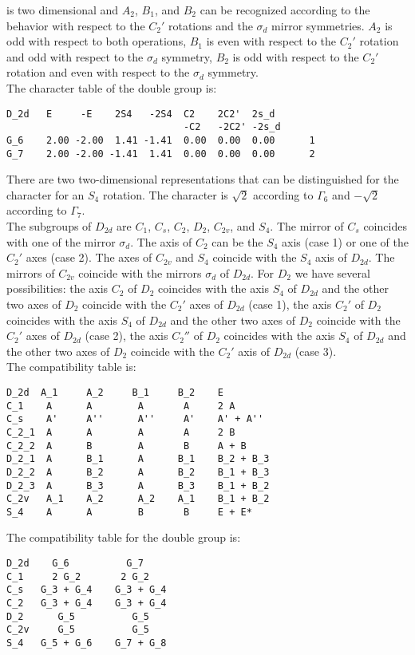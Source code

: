\documentclass[12pt,a4paper]{article}
\begin{document}
is two dimensional and $A_2$, $B_1$, and $B_2$ can be recognized according to
the behavior with respect to the $C_2'$ rotations and the $\sigma_d$
mirror symmetries. $A_2$ is odd with respect to both operations, $B_1$ is
even with respect to the $C_2'$ rotation and odd with respect to the
$\sigma_d$ symmetry, $B_2$ is odd with respect to the $C_2'$ rotation and 
even with respect to the $\sigma_d$ symmetry. \\
The character table of the double group is:
\begin{verbatim}
D_2d   E     -E    2S4   -2S4  C2    2C2'  2s_d 
                               -C2   -2C2' -2s_d
G_6    2.00 -2.00  1.41 -1.41  0.00  0.00  0.00      1
G_7    2.00 -2.00 -1.41  1.41  0.00  0.00  0.00      2
\end{verbatim}
There are two two-dimensional representations that can be distinguished
for the character for an $S_4$ rotation. The character is $\sqrt{2}$
according to $\Gamma_6$ and $-\sqrt{2}$ according to $\Gamma_7$. \\
The subgroups of $D_{2d}$ are $C_1$, $C_s$, $C_2$, $D_2$, $C_{2v}$, 
and $S_4$. The mirror of $C_s$ coincides with one of the mirror $\sigma_d$. 
The axis of $C_2$ can be the $S_4$ axis (case 1) or one of the 
$C_2'$ axes (case 2). The axes of $C_{2v}$ and $S_4$
coincide with the $S_4$ axis of $D_{2d}$. The mirrors of $C_{2v}$
coincide with the mirrors $\sigma_d$ of $D_{2d}$. For $D_2$ we have several 
possibilities: the axis $C_2$ of $D_2$ coincides with the axis $S_4$
of $D_{2d}$ and the other two axes of $D_2$ coincide with the $C_2'$ axes
of $D_{2d}$ (case 1), the axis $C_2'$ of $D_2$ coincides with the axis $S_4$
of $D_{2d}$ and the other two axes of $D_2$ coincide with the $C_2'$ axes
of $D_{2d}$ (case 2), the axis $C_2''$ of $D_2$ coincides with the axis 
$S_4$ of $D_{2d}$ and the other two axes of $D_2$ coincide with the $C_2'$ 
axis of $D_{2d}$ (case 3). \\
The compatibility table is:
\begin{verbatim}
D_2d  A_1     A_2     B_1     B_2    E
C_1    A      A        A       A     2 A 
C_s    A'     A''      A''     A'    A' + A''  
C_2_1  A      A        A       A     2 B
C_2_2  A      B        A       B     A + B
D_2_1  A      B_1      A      B_1    B_2 + B_3
D_2_2  A      B_2      A      B_2    B_1 + B_3
D_2_3  A      B_3      A      B_3    B_1 + B_2
C_2v   A_1    A_2      A_2    A_1    B_1 + B_2
S_4    A      A        B       B     E + E*
\end{verbatim}
The compatibility table for the double group is:
\begin{verbatim}
D_2d    G_6          G_7  
C_1     2 G_2       2 G_2 
C_s   G_3 + G_4    G_3 + G_4
C_2   G_3 + G_4    G_3 + G_4
D_2      G_5          G_5
C_2v     G_5          G_5
S_4   G_5 + G_6    G_7 + G_8
\end{verbatim}
\end{document}
